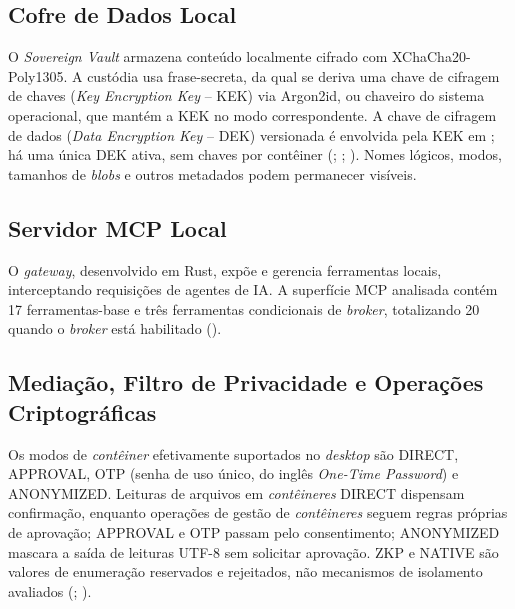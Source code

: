\subsection{Cofre de Dados Local}
O \textit{Sovereign Vault} armazena conteúdo localmente cifrado com XChaCha20-Poly1305. A custódia usa frase-secreta, da qual se deriva uma chave de cifragem de chaves (\textit{Key Encryption Key} -- KEK) via Argon2id, ou chaveiro do sistema operacional, que mantém a KEK no modo correspondente. A chave de cifragem de dados (\textit{Data Encryption Key} -- DEK) versionada é envolvida pela KEK em ; há uma única DEK ativa, sem chaves por contêiner (; ; ). Nomes lógicos, modos, tamanhos de \textit{blobs} e outros metadados podem permanecer visíveis.

\subsection{Servidor MCP Local}
O \textit{gateway}, desenvolvido em Rust, expõe e gerencia ferramentas locais, interceptando requisições de agentes de IA. A superfície MCP analisada contém 17 ferramentas-base e três ferramentas condicionais de \textit{broker}, totalizando 20 quando o \textit{broker} está habilitado ().

\subsection{Mediação, Filtro de Privacidade e Operações Criptográficas}
Os modos de \textit{contêiner} efetivamente suportados no \textit{desktop} são DIRECT, APPROVAL, OTP (senha de uso único, do inglês \textit{One-Time Password}) e ANONYMIZED. Leituras de arquivos em \textit{contêineres} DIRECT dispensam confirmação, enquanto operações de gestão de \textit{contêineres} seguem regras próprias de aprovação; APPROVAL e OTP passam pelo consentimento; ANONYMIZED mascara a saída de leituras UTF-8 sem solicitar aprovação. ZKP e NATIVE são valores de enumeração reservados e rejeitados, não mecanismos de isolamento avaliados (; ).

